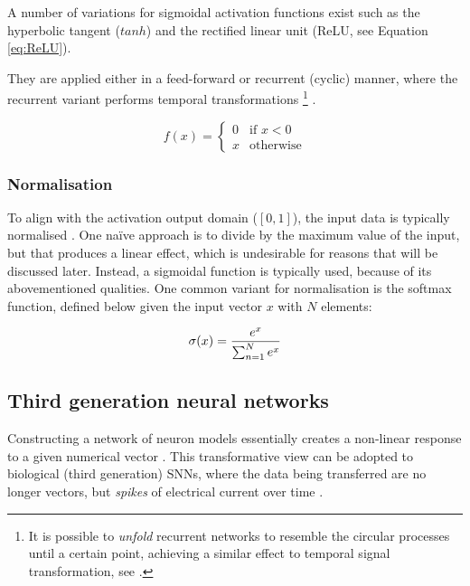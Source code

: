 \documentclass[report.tex]{subfiles}
\begin{document}
A number of variations for sigmoidal activation functions exist such as the 
hyperbolic tangent ($tanh$) and
the rectified linear unit  (ReLU, see Equation \ref{eq:ReLU}). 

They are applied either in a feed-forward or recurrent (cyclic) manner, where
the recurrent variant performs temporal transformations
\footnote{It is possible to \textit{unfold} recurrent
networks to resemble the circular processes until a certain point, achieving
a similar effect to temporal signal transformation, see \cite{Mozer1995}.}
\cite{Schmidhuber2014}.

\begin{equation} \label{eq:ReLU}
f(x) = \begin{cases}
         0 & \text{if } x < 0 \\
	 x & \text{otherwise}
       \end{cases}
\end{equation}

\subsubsection{Normalisation}
To align with the activation output domain ($[0, 1]$), the input data
is typically normalised \cite{Bishop2006}.
One naïve approach is to divide by the maximum value of the input, but
that produces a linear effect, which is undesirable for reasons that will be
discussed later.
Instead, a sigmoidal function is typically used, because of its abovementioned
qualities.
One common variant for normalisation is the softmax
function, defined below given the input vector $x$ with $N$ elements:

\begin{equation}
  \sigma(x) = { e^x \over \sum^N_{n=1} e^x}
  \label{eq:softmax}
\end{equation}

\subsection{Third generation neural networks}
Constructing a network of neuron models essentially creates a non-linear
response to a given numerical vector \cite{Russel2007}.
This transformative view can be adopted to biological (third generation)
\glspl{SNN}, where the data being transferred are no longer vectors, but 
\textit{spikes}
of electrical current over time \cite[p. 32]{Dayan2001, Eliasmith2004}.
\end{document}
